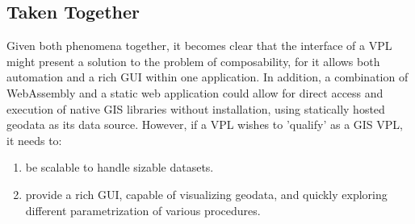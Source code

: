 








\subsection*{Taken Together}

Given both phenomena together, it becomes clear that the interface of a \ac{VPL} might present a solution to the problem of composability, for it allows both automation and a rich \ac{GUI} within one application. 
In addition, a combination of WebAssembly and a static web application could allow for direct access and execution of native \ac{GIS} libraries without installation, using statically hosted geodata as its data source. 
However, if a VPL wishes to 'qualify' as a GIS VPL, it needs to:
\begin{enumerate}
  \item be scalable to handle sizable datasets.
  \item provide a rich \ac{GUI}, capable of visualizing geodata, and quickly exploring different parametrization of various procedures.
\end{enumerate}


